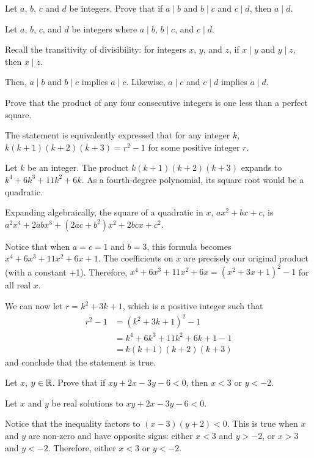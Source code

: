 \begin{recommended}
  Let $a$, $b$, $c$ and $d$ be integers.
  Prove that if $a \mid b$ and $b \mid c$ and $c \mid d$, then $a \mid d$.
\end{recommended}
\begin{prf}
  Let $a$, $b$, $c$, and $d$ be integers where $a \mid b$, $b \mid c$, and $c \mid d$.

  Recall the transitivity of divisibility:
  for integers $x$, $y$, and $z$, if $x \mid y$ and $y \mid z$, then $x \mid z$.

  Then, $a \mid b$ and $b \mid c$ implies $a \mid c$.
  Likewise, $a \mid c$ and $c \mid d$ implies $a \mid d$.
\end{prf}


\begin{recommended}
  Prove that the product of any four consecutive integers is one less than a perfect square.
\end{recommended}
\begin{prf}
  The statement is equivalently expressed that for any integer $k$,
  $k(k+1)(k+2)(k+3)=r^2-1$ for some positive integer $r$.

  Let $k$ be an integer.
  The product $k(k+1)(k+2)(k+3)$ expands to $k^4 + 6k^3 + 11k^2 + 6k$.
  As a fourth-degree polynomial, its square root would be a quadratic.

  Expanding algebraically, the square of a quadratic in $x$, $ax^2+bx+c$, is $a^2x^4 + 2abx^3 + (2ac+b^2)x^2 + 2bcx + c^2$.

  Notice that when $a=c=1$ and $b=3$, this formula becomes $x^4 + 6x^3 + 11x^2 + 6x + 1$.
  The coefficients on $x$ are precisely our original product (with a constant +1).
  Therefore, $x^4 + 6x^3 + 11x^2 + 6x = (x^2+3x+1)^2 - 1$ for all real $x$.

  We can now let $r = k^2 + 3k + 1$, which is a positive integer such that
  \begin{align*}
    r^2-1
     & = (k^2 + 3k + 1)^2 - 1            \\
     & = k^4 + 6k^3 + 11k^2 + 6k + 1 - 1 \\
     & = k(k+1)(k+2)(k+3)
  \end{align*}
  and conclude that the statement is true.
\end{prf}


\begin{recommended}
  Let $x$, $y\in\mathbb{R}$. Prove that if $xy + 2x - 3y - 6 < 0$, then $x < 3$ or $y < -2$.
\end{recommended}
\begin{prf}
  Let $x$ and $y$ be real solutions to $xy + 2x - 3y - 6 < 0$.

  Notice that the inequality factors to $(x-3)(y+2) < 0$.
  This is true when $x$ and $y$ are non-zero and have opposite signs: either $x < 3$ and $y > -2$, or $x > 3$ and $y < -2$.
  Therefore, either $x < 3$ or $y < -2$.
\end{prf}


